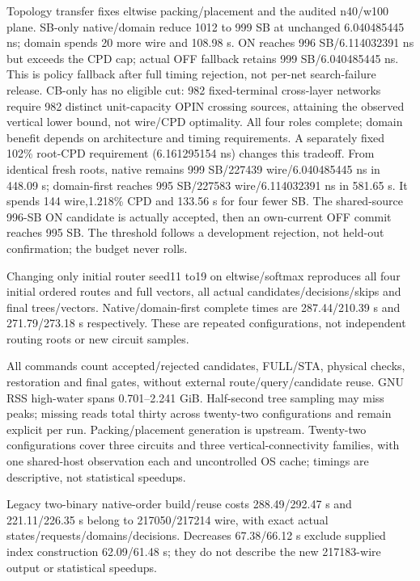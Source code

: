 \documentclass[conference,10pt]{IEEEtran}
\begin{document}
Topology transfer fixes eltwise packing/placement and the audited n40/w100 plane. SB-only native/domain reduce 1012 to 999 SB at unchanged 6.040485445 ns; domain spends 20 more wire and 108.98 s. ON reaches 996 SB/6.114032391 ns but exceeds the CPD cap; actual OFF fallback retains 999 SB/6.040485445 ns. This is policy fallback after full timing rejection, not per-net search-failure release. CB-only has no eligible cut: 982 fixed-terminal cross-layer networks require 982 distinct unit-capacity OPIN crossing sources, attaining the observed vertical lower bound, not wire/CPD optimality. All four roles complete; domain benefit depends on architecture and timing requirements. A separately fixed 102\% root-CPD requirement (6.161295154 ns) changes this tradeoff. From identical fresh roots, native remains 999 SB/227439 wire/6.040485445 ns in 448.09 s; domain-first reaches 995 SB/227583 wire/6.114032391 ns in 581.65 s. It spends 144 wire,1.218\% CPD and 133.56 s for four fewer SB. The shared-source 996-SB ON candidate is actually accepted, then an own-current OFF commit reaches 995 SB. The threshold follows a development rejection, not held-out confirmation; the budget never rolls.

Changing only initial router seed11 to19 on eltwise/softmax reproduces all four initial ordered routes and full vectors, all actual candidates/decisions/skips and final trees/vectors. Native/domain-first complete times are 287.44/210.39 s and 271.79/273.18 s respectively. These are repeated configurations, not independent routing roots or new circuit samples.

All commands count accepted/rejected candidates, FULL/STA, physical checks, restoration and final gates, without external route/query/candidate reuse. GNU RSS high-water spans 0.701--2.241 GiB. Half-second tree sampling may miss peaks; missing reads total thirty across twenty-two configurations and remain explicit per run. Packing/placement generation is upstream. Twenty-two configurations cover three circuits and three vertical-connectivity families, with one shared-host observation each and uncontrolled OS cache; timings are descriptive, not statistical speedups.

Legacy two-binary native-order build/reuse costs 288.49/292.47 s and 221.11/226.35 s belong to 217050/217214 wire, with exact actual states/requests/domains/decisions. Decreases 67.38/66.12 s exclude supplied index construction 62.09/61.48 s; they do not describe the new 217183-wire output or statistical speedups.
\end{document}
